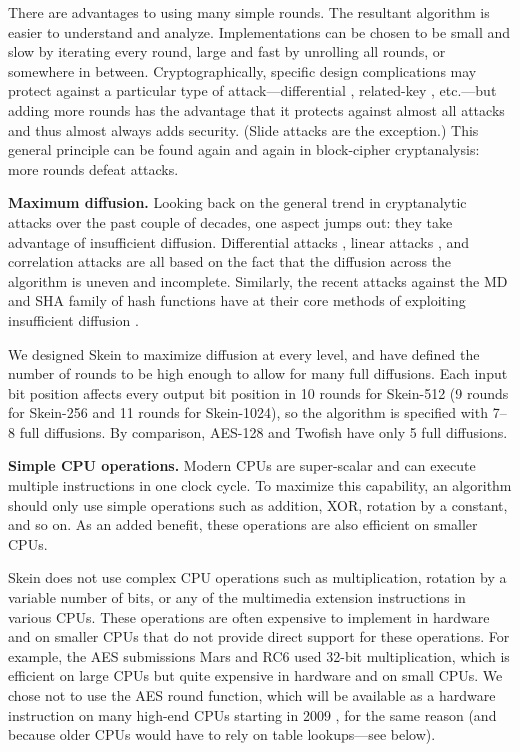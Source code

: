 \documentclass[11pt,twoside]{article}
\begin{document}
There are advantages to using many simple rounds.  The resultant algorithm is easier to understand and analyze.  Implementations can be chosen to be small and slow by iterating every round, large and fast by unrolling all rounds, or somewhere in between.  Cryptographically, specific design complications may protect against a particular type of attack---differential \cite{BS94}, related-key \cite{B94,KSW96,KSW97}, etc.---but adding more rounds has the advantage that it protects against almost all attacks and thus almost always adds security.  (Slide attacks \cite{BW99, BW00} are the exception.)  This general principle can be found again and again in block-cipher cryptanalysis: more rounds defeat attacks.

{\bf Maximum diffusion.}  Looking back on the general trend in cryptanalytic attacks over the past couple of decades, one aspect jumps out: they take advantage of insufficient diffusion.  Differential attacks \cite{BS94}, linear attacks \cite{M93}, and correlation attacks \cite{DGV94} are all based on the fact that the diffusion across the algorithm is uneven and incomplete.  Similarly, the recent attacks against the MD and SHA family of hash functions have at their core methods of exploiting insufficient diffusion \cite{BC04,WFLY04,KBPL05,WLFCY05,WY05,WYY05,KBPL05,K05a,K05b,K06,S06}.

We designed Skein to maximize diffusion at every level, and have defined the number of rounds to be high enough to allow for many full diffusions.  Each input bit position affects every output bit position in 10 rounds for Skein-512 (9 rounds for Skein-256 and 11 rounds for Skein-1024), so the algorithm is specified with 7--8 full diffusions.  By comparison, AES-128 and Twofish have only 5 full diffusions.

{\bf Simple CPU operations.}  Modern CPUs are super-scalar and can execute multiple instructions in one clock cycle.  To maximize this capability, an algorithm should only use simple operations such as addition, XOR, rotation by a constant, and so on.  As an added benefit, these operations are also efficient on smaller CPUs.

Skein does not use complex CPU operations such as multiplication, rotation by a variable number of bits, or any of the multimedia extension instructions in various CPUs.  These operations are often expensive to implement in hardware and on smaller CPUs that do not provide direct support for these operations.  For example, the AES submissions Mars \cite{MARS} and RC6 \cite {RC6} used 32-bit multiplication, which is efficient on large CPUs but quite expensive in hardware and on small CPUs.  We chose not to use the AES round function, which will be available as a hardware instruction on many high-end CPUs starting in 2009 \cite{IntelAES}, for the same reason (and because older CPUs would have to rely on table lookups---see below).
\end{document}
